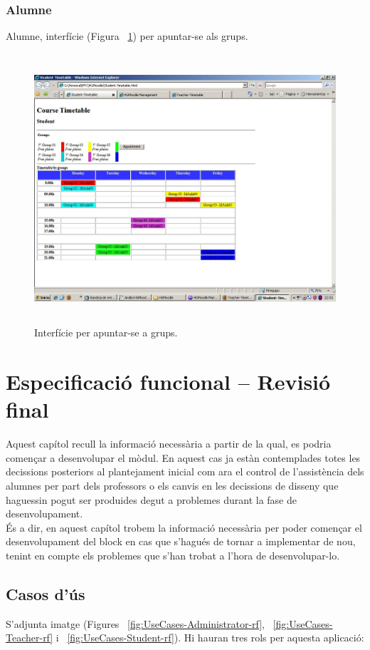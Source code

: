 \documentclass[a4paper]{report}  %
\begin{document}
\subsection{Alumne}
Alumne, interfície (Figura ~\ref{fig:Student-Timetable}) per apuntar-se als grups.
		\begin{figure}[H] %
		\begin{center}
		\includegraphics[width=12cm,height=10cm]{img/Student-Timetable.jpg}
		\caption[List caption]{Interfície per apuntar-se a grups.}
		\label{fig:Student-Timetable}
		\end{center}
		\end{figure}
\chapter{Especificació funcional – Revisió final}
Aquest capítol recull la informació necessària a partir de la qual, es podria començar a desenvolupar el mòdul. En aquest cas ja estàn contemplades totes les decissions posteriors al plantejament inicial com ara el control de l'assistència dels alumnes per part dels professors o els canvis en les decissions de disseny que haguessin pogut ser produides degut a problemes durant la fase de desenvolupament.\\
És a dir, en aquest capítol trobem la informació necessària per poder començar el desenvolupament del block en cas que s'hagués de tornar a implementar de nou, tenint en compte els problemes que s'han trobat a l'hora de desenvolupar-lo.
\section{Casos d'ús}
S’adjunta imatge (Figures ~\ref{fig:UseCases-Administrator-rf}, ~\ref{fig:UseCases-Teacher-rf} i ~\ref{fig:UseCases-Student-rf}). Hi hauran tres rols per aquesta aplicació:
\end{document}
